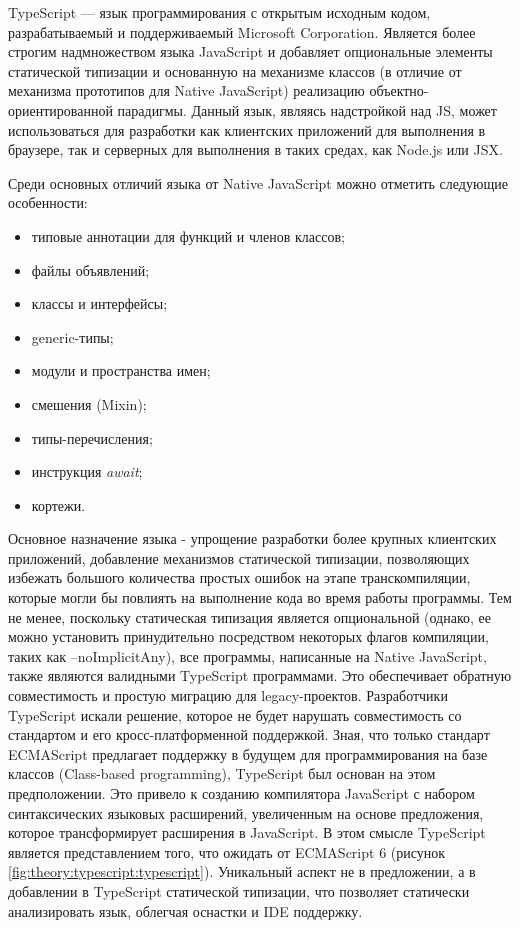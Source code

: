 
TypeScript --- язык программирования с открытым исходным кодом, разрабатываемый и поддерживаемый Microsoft Corporation. Является более строгим надмножеством языка JavaScript
и добавляет опциональные элементы статической типизации и основанную на механизме классов (в отличие от механизма прототипов для Native JavaScript) реализацию объектно-ориентированной парадигмы.
Данный язык, являясь надстройкой над JS, может использоваться для разработки как клиентских приложений для выполнения в браузере, так и серверных для выполнения в таких средах,
как Node.js или JSX. \cite{typescript1}\cite{typescript2}

Среди основных отличий языка от Native JavaScript можно отметить следующие особенности:
\begin{itemize}
\item типовые аннотации для функций и членов классов;
\item файлы объявлений;
\item классы и интерфейсы;
\item generic-типы;
\item модули и пространства имен;
\item смешения (Mixin);
\item типы-перечисления;
\item инструкция \textit{await};
\item кортежи.
\end{itemize}

Основное назначение языка - упрощение разработки более крупных клиентских приложений, добавление механизмов статической типизации, позволяющих избежать большого количества
простых ошибок на этапе транскомпиляции, которые могли бы повлиять на выполнение кода во время работы программы. Тем не менее, поскольку статическая типизация является
опциональной (однако, ее можно установить принудительно посредством некоторых флагов компиляции, таких как --noImplicitAny), все программы, написанные на Native JavaScript,
также являются валидными TypeScript программами. Это обеспечивает обратную совместимость и простую миграцию для legacy-проектов. Разработчики TypeScript искали решение,
которое не будет нарушать совместимость со стандартом и его кросс-платформенной поддержкой. Зная, что только стандарт ECMAScript\cite{ECMAScript}\cite{ECMAScript2} предлагает поддержку в будущем для
программирования на базе классов (Class-based programming), TypeScript был основан на этом предположении. Это привело к созданию компилятора JavaScript с набором
синтаксических языковых расширений, увеличенным на основе предложения, которое трансформирует расширения в JavaScript. В этом смысле TypeScript является представлением
того, что ожидать от ECMAScript 6 (рисунок \ref{fig:theory:typescript:typescript}). Уникальный аспект не в предложении, а в добавлении в TypeScript статической типизации,
что позволяет статически анализировать язык, облегчая оснастки и IDE поддержку.

